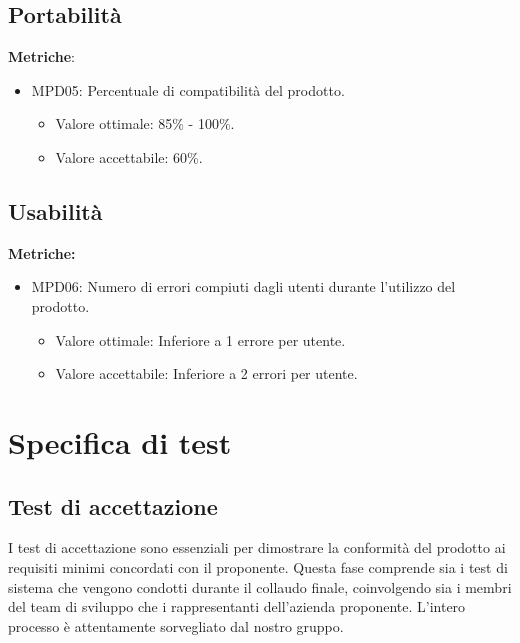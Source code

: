 \documentclass[12pt]{article}
\begin{document}
\subsection{Portabilità}
\textbf{Metriche}:
\begin{itemize}
	\item MPD05: Percentuale di compatibilità del prodotto.
	      \begin{itemize}
		      \item Valore ottimale: 85\% - 100\%.
		      \item Valore accettabile: 60\%.
	      \end{itemize}
\end{itemize}


\subsection{Usabilità}
\textbf{Metriche:}
\begin{itemize}
	\item MPD06: Numero di errori compiuti dagli utenti durante l'utilizzo del prodotto.
	      \begin{itemize}
		      \item Valore ottimale: Inferiore a 1 errore per utente.
		      \item Valore accettabile: Inferiore a 2 errori per utente.
	      \end{itemize}
\end{itemize}


\section{Specifica di test}
\subsection{Test di accettazione}
I test di accettazione sono essenziali per dimostrare la conformità del prodotto ai requisiti minimi concordati con il proponente. Questa fase comprende sia i test di sistema che vengono condotti durante il collaudo finale, coinvolgendo sia i membri del team di sviluppo che i rappresentanti dell'azienda proponente. L'intero processo è attentamente sorvegliato dal nostro gruppo.
\end{document}
